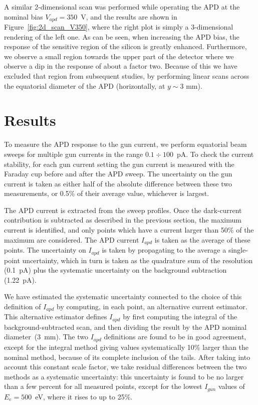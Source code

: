 \documentclass[12p]{paper}
\begin{document}
A similar 2-dimensional scan was performed while operating the APD at the nominal bias $V_{apd}=350$~V, and the results are shown in Figure~\ref{fig:2d_scan_V350}, where the right plot is simply a 3-dimensional rendering of the left one. As can be seen, when increasing the APD bias, the response of the sensitive region of the silicon is greatly enhanced. Furthermore, we observe a small region towards the upper part of the detector where we observe a dip in the response of about a factor two. Because of this we have excluded that region from subsequent studies, by performing linear scans across the equatorial diameter of the APD (horizontally, at $y\sim 3$ mm).
\clearpage

\section{Results}

To measure the APD response to the gun current, we perform equatorial beam sweeps for multiple gun currents in the range $0.1 \div 100$~pA. To check the current stability, for each gun current setting the gun current is measured with the Faraday cup before and after the APD sweep. The uncertainty on the gun current is taken as either half of the absolute difference between these two measurements, or 0.5\% of their average value, whichever is largest.

The APD current is extracted from the sweep profiles. Once the dark-current contribution is subtracted as described in the previous section, the maximum current is identified, and only points which have a current larger than 50\% of the maximum are considered. The APD current $I_{apd}$ is taken as the average of these points. The uncertainty on $I_{apd}$ is taken by propagating to the average a single-point uncertainty, which in turn is taken as the quadrature sum of the resolution (0.1~pA) plus the systematic uncertainty on the background subtraction (1.22~pA).

We have estimated the systematic uncertainty connected to the choice of this definition of $I_{apd}$ by computing, in each point, an alternative current estimator. This alternative estimator defines $I_{apd}$ by first computing the integral of the background-subtracted scan, and then dividing the result by the APD nominal diameter~(3~mm). The two $I_{apd}$ definitions are found to be in good agreement,  except for the integral method giving values systematically 10\% larger than the nominal method, because of its complete inclusion of the tails. After taking into account this constant scale factor, we take residual differences between the two methods as a systematic uncertainty: this uncertainty is found to be no larger than a few percent for all measured points, except for the lowest $I_{gun}$ values of $E_e = 500$~eV, where it rises to up to 25\%. 
\end{document}
